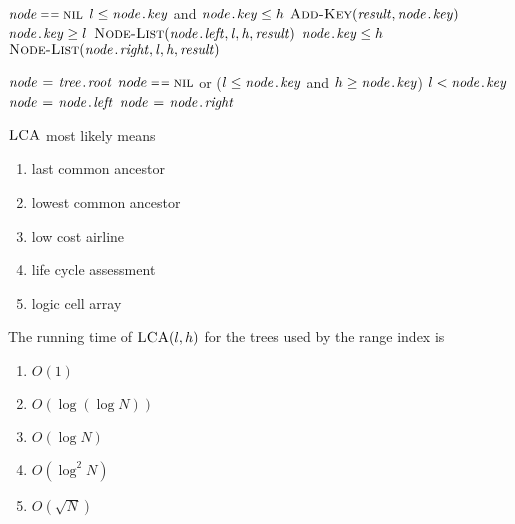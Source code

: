 \documentclass[12pt,twoside]{article}
\begin{document}
\begin{problems}
\begin{codebox}
\li \If $\id{node} \isequal \const{nil}$
\li   \Then
        \Return  \label{li:node-list-ret}
    \End
\li \If $l \le \attribii{node}{key}$ and $\attribii{node}{key} \le h$ 
\li   \Then
        $\proc{Add-Key}(\id{result}, \attribii{node}{key})$
    \End
\li \If $\attribii{node}{key} \ge l$
    \label{li:node-list-prune-l}
\li   \Then
        $\proc{Node-List}(\attribii{node}{left}, \id{l}, \id{h}, \id{result})$
    \End
\li \If $\attribii{node}{key} \le h$
    \label{li:node-list-prune-r}
\li   \Then
        $\proc{Node-List}(\attribii{node}{right}, \id{l}, \id{h}, \id{result})$
    \End
\end{codebox}

\begin{codebox}
\li $\id{node} \gets \attribii{tree}{root}$
\li {} $node \isequal \const{nil}$ or
           ($l \le \attribii{node}{key}$ and $h \ge \attribii{node}{key}$)
    \label{li:lca-loop}
\li    \Do
          \If $l < \attribii{node}{key}$
          \label{li:lca-branch-direction}
\li         \Then
              $\id{node} \gets \attribii{node}{left}$
              \label{li:lca-go-left}
\li         \Else
\li           $\id{node} \gets \attribii{node}{right}$
              \label{li:lca-go-right}
          \End
    \End
\li \Return {}
\end{codebox}

\begin{problemparts}

\problempart {} $\textnormal{\scshape LCA}$ most likely means
\begin{enumerate}
  \item last common ancestor
  \item lowest common ancestor
  \item low cost airline
  \item life cycle assessment
  \item logic cell array
\end{enumerate}
  
\problempart {} The running time of $\textnormal{\scshape LCA}(l, h)$ for the trees
used by the range index is
\begin{enumerate}
  \item $O(1)$
  \item $O(\log(\log N))$
  \item $O(\log N)$
  \item $O(\log^2 N)$
  \item $O(\sqrt{N})$
\end{enumerate}


\end{problemparts}
\end{problems}
\end{document}
